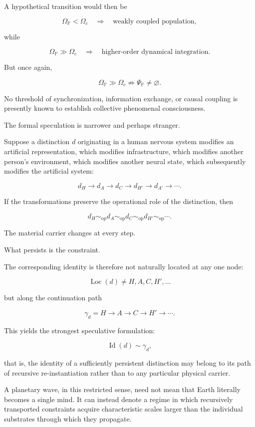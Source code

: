 \documentclass[11pt]{article}
\begin{document}
A hypothetical transition would then be

\[
\Omega_{\mathbb{P}}
<
\Omega_c
\quad\Rightarrow\quad
\text{weakly coupled population},
\]

while

\[
\Omega_{\mathbb{P}}
\gg
\Omega_c
\quad\Rightarrow\quad
\text{higher-order dynamical integration}.
\]

But once again,

\[
\Omega_{\mathbb{P}}
\gg
\Omega_c
\not\Rightarrow
\Psi_{\mathbb{P}}\neq\varnothing.
\]

No threshold of synchronization, information exchange, or causal coupling is presently known to establish collective phenomenal consciousness.

The formal speculation is narrower and perhaps stranger.

Suppose a distinction $d$ originating in a human nervous system modifies an artificial representation, which modifies infrastructure, which modifies another person's environment, which modifies another neural state, which subsequently modifies the artificial system:

\[
d_H
\rightarrow
d_A
\rightarrow
d_C
\rightarrow
d_{H'}
\rightarrow
d_{A'}
\rightarrow\cdots.
\]

If the transformations preserve the operational role of the distinction, then

\[
d_H
\sim_{\mathrm{op}}
d_A
\sim_{\mathrm{op}}
d_C
\sim_{\mathrm{op}}
d_{H'}
\sim_{\mathrm{op}}
\cdots.
\]

The material carrier changes at every step.

What persists is the constraint.

The corresponding identity is therefore not naturally located at any one node:

\[
\operatorname{Loc}(d)
\neq
H,
A,
C,
H',
\ldots
\]

but along the continuation path

\[
\gamma_d
=
H\rightarrow A\rightarrow C\rightarrow H'\rightarrow\cdots.
\]

This yields the strongest speculative formulation:

\[
\boxed{
\operatorname{Id}(d)
\sim
\gamma_d,
}
\]

that is, the identity of a sufficiently persistent distinction may belong to its path of recursive re-instantiation rather than to any particular physical carrier.

A planetary wave, in this restricted sense, need not mean that Earth literally becomes a single mind. It can instead denote a regime in which recursively transported constraints acquire characteristic scales larger than the individual substrates through which they propagate.
\end{document}
